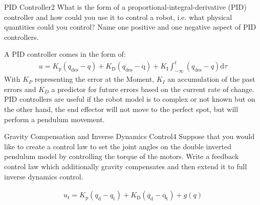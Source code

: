 \begin{questions}
	
	
	\begin{question}{PID Controller}{2}
		What is the form of a proportional-integral-derivative (PID) controller and how could you use it to control a robot, i.e. what physical quantities could you control? Name one positive and one negative aspect of PID controllers.
		
\begin{answer}
A PID controller comes in the form of: \begin{align*}
	u=K_{\textrm{p}} (q_{\textrm{des}} - q) + K_{\textrm{D}} (\dot{q_{\textrm{des}}} - \dot{\textrm{q}}) + K_{\textrm{I}} \int_{-\infty}^{t}(q_{\textrm{des}} - q)\textrm{d}\tau
\end{align*}
With $K_P$ representing the error at the Moment, $K_I$ an accumulation of the past errors and $K_D$ a predictor for future errors based on the current rate of change. 
PID controllers are useful if the robot model is to complex or not known but on the other hand, the end effector will not move to the perfect spot, but will perform a pendulum movement.
\end{answer}
		
	\end{question}
	
		
	\begin{question}{Gravity Compensation and Inverse Dynamics Control}{4}
		Suppose that you would like to create a control law to set the joint angles on the double inverted pendulum model by controlling the torque of the motors. Write a feedback control law which additionally gravity compensates and then extend it to full inverse dynamics control. 
		
\begin{answer}
	\begin{align*}
		u_t=K_{\textrm{p}} (q_{\textrm{d}} - q_{\textrm{t}}) + K_{\textrm{D}} (\dot{q_{\textrm{d}}} - \dot{\textrm{q}_{\textrm{t}}}) + g(q)
	\end{align*}
\end{answer}
		

\end{question}
\end{questions}
